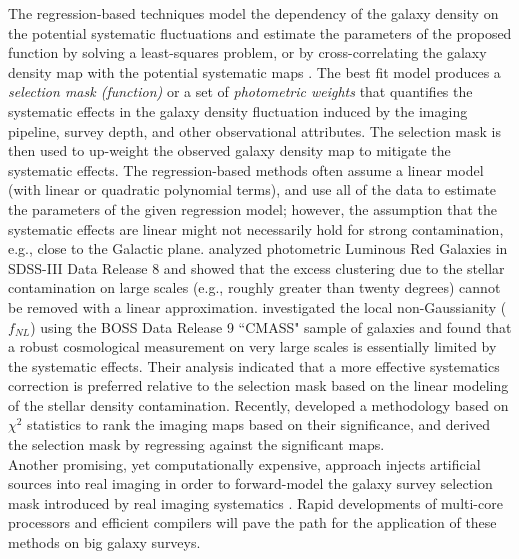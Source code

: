 The regression-based techniques model the dependency of the galaxy density on the potential systematic fluctuations and estimate the parameters of the proposed function by solving a least-squares problem, or by cross-correlating the galaxy density map with the potential systematic maps \citep[see e.g.][]{ross2011ameliorating, ashley2012MNRAS,Ross17,2012ApJ...761...14H,delubac2016sdss, prakash2016sdss, Raichoor2017MNRAS.471.3955R, laurent2017clustering, Elvin18, 2018ApJ...863..110B}. The best fit model produces a \textit{selection mask (function)} or a set of \textit{photometric weights} that quantifies the systematic effects in the galaxy density fluctuation induced by the imaging pipeline, survey depth, and other observational attributes. The selection mask is then used to up-weight the observed galaxy density map to mitigate the systematic effects. The regression-based methods often assume a linear model (with linear or quadratic polynomial terms), and use all of the data to estimate the parameters of the given regression model; however, the assumption that the systematic effects are linear might not necessarily hold for strong contamination, e.g., close to the Galactic plane. \citet{2012ApJ...761...14H} analyzed photometric Luminous Red Galaxies in SDSS-III Data Release 8 and showed that the excess clustering due to the stellar contamination on large scales (e.g., roughly greater than twenty degrees) cannot be removed with a linear approximation. \citet{rossfNL} investigated the local non-Gaussianity ($f_{NL}$) using the BOSS Data Release 9 ``CMASS" sample of galaxies \citep{ahn2012ninth} and found that a robust cosmological measurement on very large scales is essentially limited by the systematic effects. Their analysis indicated that a more effective systematics correction is preferred relative to the selection mask based on the linear modeling of the stellar density contamination. Recently, \citet{Elvin18} developed a methodology based on $\chi^{2}$ statistics to rank the imaging maps based on their significance, and derived the selection mask by regressing against the significant maps.\\

Another promising, yet computationally expensive, approach injects artificial sources into real imaging in order to forward-model the galaxy survey selection mask introduced by real imaging systematics \citep[see e.g.][]{berge2013ultra,Balrog}. Rapid developments of multi-core processors and efficient compilers will pave the path for the application of these methods on big galaxy surveys.\\




